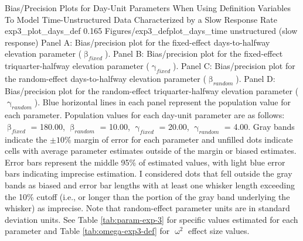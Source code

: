 \documentclass[
12pt, %
twoside,
english]{guelphthesis}
\begin{document}
\begin{apaFigure}
[portrait]
[samepage]
[-0.2cm]
{Bias/Precision Plots for Day-Unit Parameters When Using Definition Variables To Model Time-Unstructured Data Characterized by a Slow Response Rate}
{exp3_plot_days_def}
{0.165}
{Figures/exp3_defplot_days_time unstructured (slow response)}
{Panel A: Bias/precision plot for the fixed-effect days-to-halfway elevation parameter ($\upbeta_{fixed}$). Panel B: Bias/precision plot for the fixed-effect triquarter-halfway elevation parameter ($\upgamma_{fixed}$). Panel C: Bias/precision plot for the random-effect days-to-halfway elevation parameter ($\upbeta_{random}$). Panel D: Bias/precision plot for the random-effect triquarter-halfway elevation parameter ($\upgamma_{random}$). Blue horizontal lines in each panel represent the population value for each parameter. Population values for each day-unit parameter are as follows: $\upbeta_{fixed}$ = 180.00, $\upbeta_{random}$ = 10.00, $\upgamma_{fixed}$ = 20.00, $\upgamma_{random}$ = 4.00. Gray bands indicate the $\pm 10\%$ margin of error for each parameter and unfilled dots indicate cells with average parameter estimates outside of the margin or biased estimates. Error bars represent the middle 95\% of estimated values, with light blue error bars indicating imprecise estimation. I considered dots that fell outside the gray bands as biased and error bar lengths with at least one whisker length exceeding the 10\% cutoff (i.e., or longer than the portion of the gray band underlying the whisker) as imprecise. Note that random-effect parameter units are in standard deviation units. See Table \ref{tab:param-exp-3} for specific values estimated for each parameter and Table \ref{tab:omega-exp3-def} for $\upomega^2$ effect size values.}
\end{apaFigure}
\end{document}
